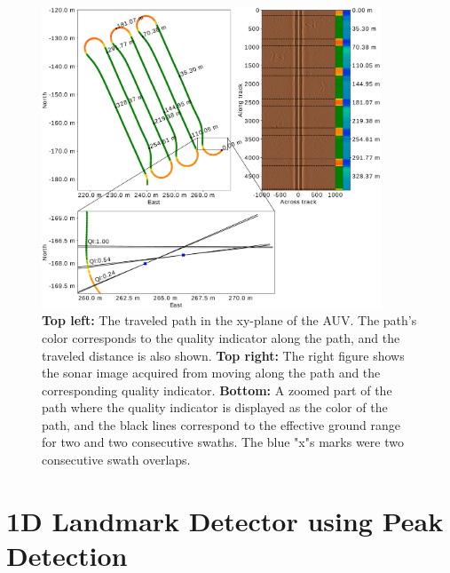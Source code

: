 \begin{figure} %
  \centering
  \includegraphics[trim=0cm 0cm 0cm 0cm, clip=true, width=0.9\textwidth]{figures/quality_indicator_and_path.pdf}
  \caption[Path with quality indicator overlayed]{\textbf{Top left:} The traveled path in the xy-plane of the AUV. The path's color corresponds to the quality indicator along the path, and the traveled distance is also shown. \textbf{Top right:} The right figure shows the sonar image acquired from moving along the path and the corresponding quality indicator. \textbf{Bottom:} A zoomed part of the path where the quality indicator is displayed as the color of the path, and the black lines correspond to the effective ground range for two and two consecutive swaths. The blue "x"s marks were two consecutive swath overlaps.}
  \label{fig:path_and_quality_ind}
\end{figure}

\section{1D Landmark Detector using Peak Detection}

